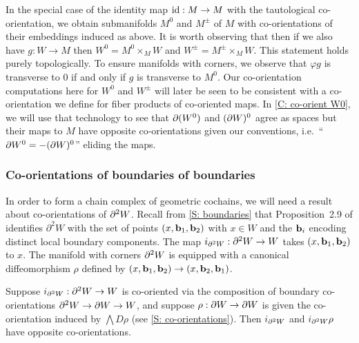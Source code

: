 \begin{example}
	In the special case of the identity map $\mathrm{id}:M\to M$ with the tautological co-orientation, we obtain submanifolds $M^0$ and $M^{\pm}$ of $M$ with co-orientations of their embeddings induced as above.
	It is worth observing that then if we also have $g \colon W \to M$ then $W^0=M^0\times_M W$ and $W^{\pm}=M^{\pm}\times_M W$.
	This statement holds purely topologically.
	To ensure manifolds with corners, we observe that $\varphi g$ is transverse to $0$ if and only if $g$ is transverse to $M^0$.
	Our co-orientation computations here for $W^0$ and $W^\pm$ will later be seen to be consistent with a co-orientation we define for fiber products of co-oriented maps.
	In \cref{C: co-orient W0}, we will use that technology to see that $\partial (W^0)$ and $(\partial W)^0$ agree as spaces but their maps to $M$ have opposite co-orientations given our conventions, i.e.\ ``$\partial W^0=-(\partial W)^0$'' eliding the maps.
\end{example}

\begin{comment}
	\red{TO DO SOMEWHERE: It will be convenient to show that $g:W^0\to M$ with this co-orientation is the pullback of $M^0\into M$ (co-oriented as defined here) and $g \colon W \to M$ and similarly for $g:W^\pm\to M$.
		Also need to rewrite things in other places as $M^0$, $M^\pm$, etc instead of always writing $\varphi^{-1}((\infty,0])$ etc.
		Also need to show that $\bd W^0=-(\bd W)^0$, which should follow from the Leibniz rule and the first thing the previous sentence.}
\end{comment}

\subsubsection{Co-orientations of boundaries of boundaries}

In order to form a chain complex of geometric cochains, we will need a result about co-orientations of $\partial^2W$.
Recall from \cref{S: boundaries} that Proposition~2.9 of \cite{Joy12} identifies $\partial^2 W$ with the set of points $(x,\mathbf{b}_1,\mathbf{b}_2)$ with $x\in W$ and the $\mathbf{b}_i$ encoding distinct local boundary components.
The map $i_{\partial^2W}:\partial^2W\to W$ takes $(x,\mathbf{b}_1,\mathbf{b}_2)$ to $x$.
The manifold with corners $\partial^2W$ is equipped with a canonical diffeomorphism $\rho$ defined by $(x,\mathbf{b}_1,\mathbf{b}_2)\to (x,\mathbf{b}_2,\mathbf{b}_1)$.

\begin{lemma}\label{L: boundary2}
	Suppose $i_{\partial^2W}:\partial^2W\to W$ is co-oriented via the composition of boundary co-orientations $\partial^2W\to \partial W\to W$, and suppose $\rho:\partial W\to \partial W$ is given the co-orientation induced by $\bigwedge D\rho$ (see \cref{S: co-orientations}).
	Then $i_{\partial^2W}$ and $i_{\partial^2W}\rho$ have opposite co-orientations.
\end{lemma}


